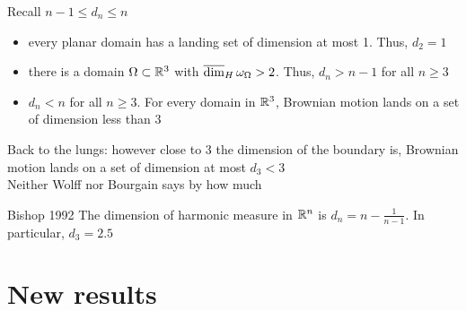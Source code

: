 Recall $n-1\leq d_n\leq n$
\begin{itemize}
\item {} every planar domain has a landing set of dimension at most 1. Thus, $d_2=1$
\item {} there is a domain $\Omega\subset\mathbb{R}^3$ with $\overline{\dim}_H\,\omega_\Omega>2$. Thus, $d_n>n-1$ for all $n\geq3$
\item {} $d_n<n$ for all $n\geq3$. For every domain in $\mathbb{R}^3$, Brownian motion lands on a set of dimension less than 3
\end{itemize}
\begin{center}
\textcolor{c3}{Back to the lungs: however close to 3 the dimension of the boundary is, Brownian motion lands on a set of dimension at most $d_3<3$}\\ \small{Neither Wolff nor Bourgain says by how much}
\end{center}
\begin{conjecture}{Bishop 1992}
The dimension of harmonic measure in $\mathbb{R}^n$ is $d_n=n-\frac{1}{n-1}$. In particular, $d_3=2.5$
\end{conjecture}

\section*{New results}

